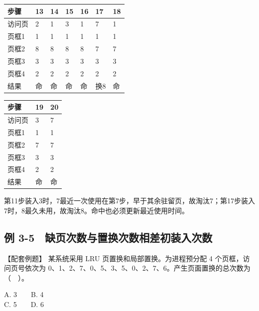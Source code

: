 \begin{wideblock}\par\medskip\noindent\begin{minipage}{\linewidth}\fontsize{9.3}{12}\selectfont\begin{tabularx}{\linewidth}{@{}YYYYYYY@{}}
\toprule\noalign{}
步骤 & 13 & 14 & 15 & 16 & 17 & 18 \\
\midrule\noalign{}


访问页 & 2 & 1 & 3 & 1 & 7 & 1 \\
页框1 & 1 & 1 & 1 & 1 & 1 & 1 \\
页框2 & 8 & 8 & 8 & 8 & 7 & 7 \\
页框3 & 3 & 3 & 3 & 3 & 3 & 3 \\
页框4 & 2 & 2 & 2 & 2 & 2 & 2 \\
结果 & 命 & 命 & 命 & 命 & 换8 & 命 \\
\bottomrule\end{tabularx}
\end{minipage}\par\medskip\end{wideblock}

\par\medskip\noindent\begin{minipage}{\linewidth}\fontsize{9.3}{12}\selectfont\begin{tabularx}{\linewidth}{@{}YYY@{}}
\toprule\noalign{}
步骤 & 19 & 20 \\
\midrule\noalign{}


访问页 & 3 & 7 \\
页框1 & 1 & 1 \\
页框2 & 7 & 7 \\
页框3 & 3 & 3 \\
页框4 & 2 & 2 \\
结果 & 命 & 命 \\
\bottomrule\end{tabularx}
\end{minipage}\par\medskip

第11步装入3时，7最近一次使用在第7步，早于其余驻留页，故淘汰7；第17步装入7时，8最久未用，故淘汰8。命中也必须更新最近使用时间。

\subsection{例 3-5　缺页次数与置换次数相差初装入次数}\label{OS03-ex5-5}

\begin{example}[配套例题]

【配套例题】 某系统采用 LRU 页置换和局部置换。为进程预分配 4 个页框，访问页号依次为 0、1、2、7、0、5、3、5、0、2、7、6。产生页面置换的总次数为（　）。

A. 3　　B. 4\\
C. 5　　D. 6

\end{example}

